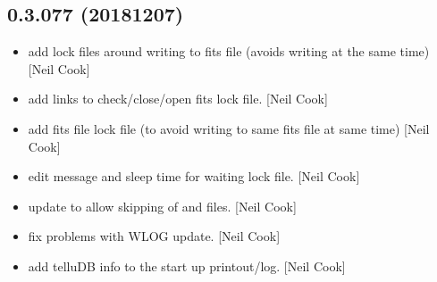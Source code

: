 \documentclass[a4paper,10pt,english]{report}
\begin{document}
\subsection{0.3.077 (2018\sphinxhyphen{}12\sphinxhyphen{}07)}
\label{\detokenize{misc/changelog:id265}}\begin{itemize}
\item {} 
 \sphinxhyphen{} add lock files around writing to fits file (avoids
writing at the same time) {[}Neil Cook{]}

\item {} 
 \sphinxhyphen{} add links to check/close/open fits lock
file. {[}Neil Cook{]}

\item {} 
 \sphinxhyphen{} add fits file lock file (to avoid writing to same fits
file at same time) {[}Neil Cook{]}

\item {} 
 \sphinxhyphen{} edit message and sleep time for waiting lock file. {[}Neil
Cook{]}

\item {} 
 \sphinxhyphen{} update to allow skipping of  and 
files. {[}Neil Cook{]}

\item {} 
 \sphinxhyphen{} fix problems with WLOG update. {[}Neil Cook{]}

\item {} 
 \sphinxhyphen{} add telluDB info to the start up printout/log.
{[}Neil Cook{]}

\end{itemize}
\end{document}
